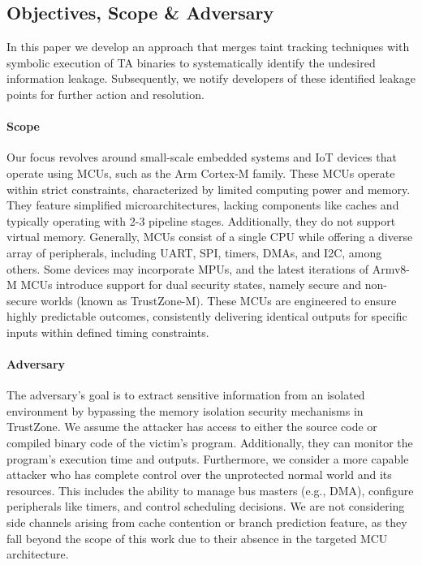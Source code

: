 \subsection{Objectives, Scope \& Adversary}
%
In this paper we develop an approach that merges taint tracking techniques
with symbolic execution of \ac{TA} binaries to
systematically identify the undesired information leakage. Subsequently, we
notify developers of these identified leakage points for
further action and resolution. 

\paragraph{\textbf{Scope}} Our focus revolves around small-scale embedded
systems and IoT devices that operate using MCUs, such as the Arm Cortex-M
family. These MCUs operate within strict constraints, characterized by
limited computing power and memory. They feature simplified
microarchitectures, lacking components like caches and typically operating
with 2-3 pipeline stages. Additionally, they do not support virtual memory.
Generally, MCUs consist of a single CPU while offering a diverse array of
peripherals, including UART, SPI, timers, DMAs, and I2C, among others. Some
devices may incorporate MPUs, and the latest iterations of Armv8-M MCUs
introduce support for dual security states, namely secure and non-secure
worlds (known as TrustZone-M). These MCUs are engineered to ensure highly
predictable outcomes, consistently delivering identical outputs for
specific inputs within defined timing constraints.

\paragraph{\textbf{Adversary}} The adversary’s goal is to extract
sensitive information from an isolated environment by bypassing the memory
isolation security mechanisms in TrustZone. We assume the attacker has
access to either the source code or compiled binary code of the victim's
program. Additionally, they can monitor the program's execution time and
outputs. Furthermore, we consider a more capable attacker who has complete
control over the unprotected normal world and its resources. This includes
the ability to manage bus masters (e.g., DMA), configure peripherals like
timers, and control scheduling decisions. We are not considering side
channels arising from cache contention or branch prediction feature, as
they fall beyond the scope of this work due to their absence in the
targeted MCU architecture.

